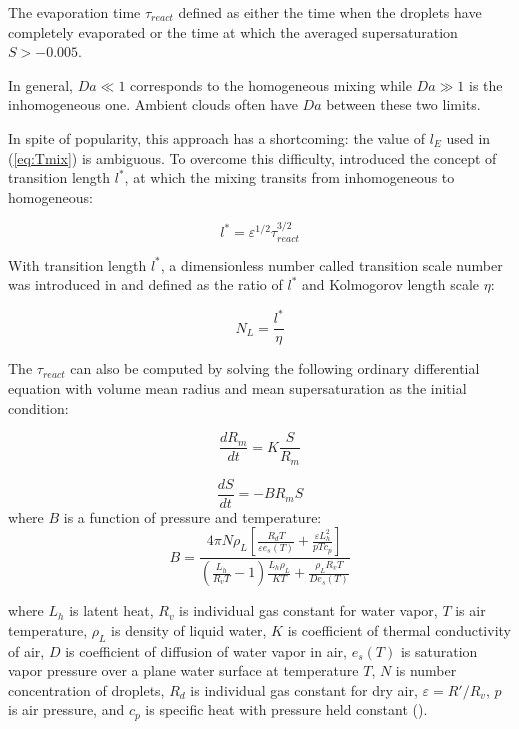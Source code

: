 The evaporation time $\tau_{react}$ defined as either the time when the
droplets have completely evaporated or the time at which the averaged
supersaturation $S > -0.005$.

In general, $Da\ll1$ corresponds to the homogeneous mixing while $Da\gg1$ is
the inhomogeneous one. Ambient clouds often have $Da$ between these two limits.

In spite of popularity, this approach has a shortcoming: the value of $l_E$
used in (\ref{eq:Tmix}) is ambiguous. To overcome this difficulty,
\cite{Lehmann09} introduced the concept of transition length $l^{*}$, at which
the mixing transits from inhomogeneous to homogeneous:

\begin{equation}
l^{*}=\varepsilon^{1/2}\tau_{react}^{3/2}\label{eq:TransL}
\end{equation}

With transition length $l^{*}$, a dimensionless number called transition scale
number was introduced in \cite{Chunsong13} and defined as the ratio of $l^{*}$
and Kolmogorov length scale $\eta$:

\begin{equation}
N_{L}=\frac{l^{*}}{\eta}\label{eq:NL}
\end{equation}

The $\tau_{react}$ can also be computed by solving the following ordinary
differential equation with volume mean radius and mean supersaturation as the
initial condition:

\begin{equation}
\frac{dR_{m}}{dt}=K\frac{S}{R_{m}}\label{eq:DiffR}
\end{equation}

\begin{equation}
\frac{dS}{dt}=-BR_{m}S\label{eq:DiffSuper}
\end{equation}
where $B$ is a function of pressure and temperature:
\begin{equation}
B = 
\frac{4\pi N\rho_L[\frac{R_dT}{\varepsilon e_s(T)} + \frac{\varepsilon L^2_h}{pTc_p}]} 
{(\frac{L_h}{R_vT}-1)\frac{L_h\rho_L}{KT} + \frac{\rho_L R_v T}{De_s(T)}}
\end{equation}

where $L_h$ is latent heat, $R_v$ is individual gas constant for water vapor,
$T$ is air temperature, $\rho_L$ is density of liquid water, $K$ is coefficient
of thermal conductivity of air, $D$ is coefficient of diffusion of water vapor
in air, $e_s(T)$ is saturation vapor pressure over a plane water surface at
temperature $T$, $N$ is number concentration of droplets, $R_d$ is individual
gas constant for dry air, $\varepsilon = R'/R_v$, $p$ is air pressure, and
$c_p$ is specific heat with pressure held constant (\cite{Lu2011}).

